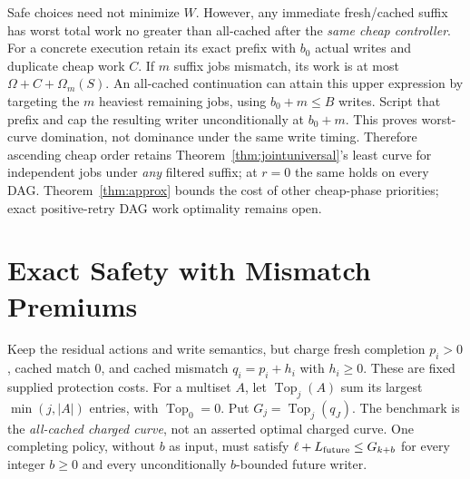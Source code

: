 \documentclass[acmsmall,screen,review,anonymous]{acmart}
\begin{document}
Safe choices need not minimize $W$. However, any immediate fresh/cached suffix has worst total work no greater than all-cached after the \emph{same cheap controller}. For a concrete execution retain its exact prefix with $b_0$ actual writes and duplicate cheap work $C$. If $m$ suffix jobs mismatch, its work is at most $\Omega+C+\Omega_m(S)$. An all-cached continuation can attain this upper expression by targeting the $m$ heaviest remaining jobs, using $b_0+m\le B$ writes. Script that prefix and cap the resulting writer unconditionally at $b_0+m$. This proves worst-curve domination, not dominance under the same write timing. Therefore ascending cheap order retains Theorem~\ref{thm:jointuniversal}'s least curve for independent jobs under \emph{any} filtered suffix; at $r=0$ the same holds on every DAG. Theorem~\ref{thm:approx} bounds the cost of other cheap-phase priorities; exact positive-retry DAG work optimality remains open.


\section{Exact Safety with Mismatch Premiums}
\label{sec:chargedresidual}

Keep the residual actions and write semantics, but charge fresh completion $p_i>0$, cached match 0, and cached mismatch $q_i=p_i+h_i$ with $h_i\ge0$. These are fixed supplied protection costs. For a multiset $A$, let $\operatorname{Top}_j(A)$ sum its largest $\min(j,|A|)$ entries, with $\operatorname{Top}_0=0$. Put $G_j=\operatorname{Top}_j(q_J)$. The benchmark is the \emph{all-cached charged curve}, not an asserted optimal charged curve. One completing policy, without $b$ as input, must satisfy $\ell+L_{\rm future}\le G_{k+b}$ for every integer $b\ge0$ and every unconditionally $b$-bounded future writer.
\end{document}
